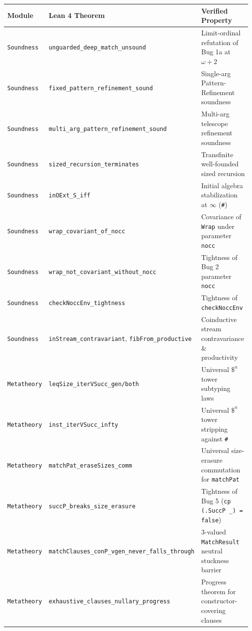 \documentclass[11pt,a4paper]{article}
\begin{document}
\begin{table}[ht]
\centering
\footnotesize
\begin{tabular}{@{}lll@{}}
\toprule
\textbf{Module} & \textbf{Lean 4 Theorem} & \textbf{Verified Property} \\
\midrule
\texttt{Soundness} & \texttt{unguarded\_deep\_match\_unsound} & Limit-ordinal refutation of Bug 1a at $\omega + 2$ \\
\texttt{Soundness} & \texttt{fixed\_pattern\_refinement\_sound} & Single-arg Pattern-Refinement soundness \\
\texttt{Soundness} & \texttt{multi\_arg\_pattern\_refinement\_sound} & Multi-arg telescope refinement soundness \\
\texttt{Soundness} & \texttt{sized\_recursion\_terminates} & Transfinite well-founded sized recursion \\
\texttt{Soundness} & \texttt{inOExt\_S\_iff} & Initial algebra stabilization at $\infty$ (\texttt{\#}) \\
\texttt{Soundness} & \texttt{wrap\_covariant\_of\_nocc} & Covariance of \texttt{Wrap} under parameter \texttt{nocc} \\
\texttt{Soundness} & \texttt{wrap\_not\_covariant\_without\_nocc} & Tightness of Bug 2 parameter \texttt{nocc} \\
\texttt{Soundness} & \texttt{checkNoccEnv\_tightness} & Tightness of \texttt{checkNoccEnv} \\
\texttt{Soundness} & \texttt{inStream\_contravariant}, \texttt{fibFrom\_productive} & Coinductive stream contravariance \& productivity \\
\midrule
\texttt{Metatheory} & \texttt{leqSize\_iterVSucc\_gen/both} & Universal $\$^n$ tower subtyping laws \\
\texttt{Metatheory} & \texttt{inst\_iterVSucc\_infty} & Universal $\$^n$ tower stripping against \texttt{\#} \\
\texttt{Metatheory} & \texttt{matchPat\_eraseSizes\_comm} & Universal size-erasure commutation for \texttt{matchPat} \\
\texttt{Metatheory} & \texttt{succP\_breaks\_size\_erasure} & Tightness of Bug 5 (\texttt{cp (.SuccP \_) = false}) \\
\texttt{Metatheory} & \texttt{matchClauses\_conP\_vgen\_never\_falls\_through} & 3-valued \texttt{MatchResult} neutral stuckness barrier \\
\texttt{Metatheory} & \texttt{exhaustive\_clauses\_nullary\_progress} & Progress theorem for constructor-covering clauses \\

\end{tabular}
\end{table}
\end{document}
